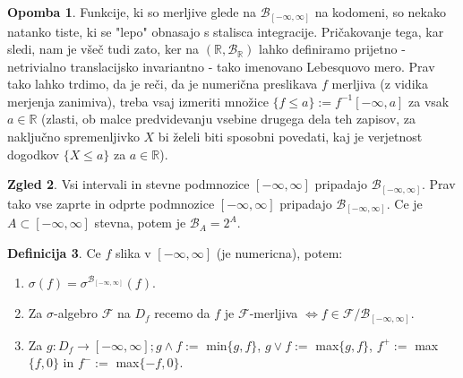 \documentclass[a4paper,12pt]{article}
\theoremstyle{definition} %
\newtheorem{definicija}{Definicija}[section]
\newtheorem{zgled}[definicija]{Zgled}
\newtheorem{opomba}[definicija]{Opomba}
\theoremstyle{plain} %
\newcommand{\R}{\mathbb{R}}
\newcommand{\F}{\mathcal{F}}
\begin{document}
            \begin{opomba}
                Funkcije, ki so merljive glede na $\mathcal{B}_{[-\infty, \infty]}$ na kodomeni, so nekako natanko tiste, ki se "lepo" 
                obnasajo s stalisca integracije. Pričakovanje tega, kar sledi, nam je všeč tudi zato, ker na $(\R, \mathcal{B}_\R)$ 
                lahko definiramo prijetno - netrivialno translacijsko invariantno - tako imenovano Lebesquovo mero. Prav tako lahko 
                trdimo, da je reči, da je numerična preslikava $f$ merljiva (z vidika merjenja zanimiva),
                 treba vsaj izmeriti množice $\{f \leq a\}:= f^{-1}{[-\infty, a]}$ za vsak $a \in \R$ (zlasti, 
                ob malce predvidevanju vsebine drugega dela teh zapisov, za naključno spremenljivko $X$ bi 
                želeli biti sposobni povedati, kaj je verjetnost dogodkov $\{X \leq a\}$ za $a \in \R$).
            \end{opomba}

            \begin{zgled}
                Vsi intervali in stevne podmnozice $[-\infty, \infty]$ pripadajo $\mathcal{B}_{[-\infty, \infty]}$. Prav tako vse zaprte in odprte podmnozice $[-\infty, \infty]$ pripadajo $\mathcal{B}_{[-\infty, \infty]}$. Ce je $A \subset [-\infty, \infty]$ stevna, potem je $\mathcal{B}_A = 2^A.$
            \end{zgled}
        
            \begin{definicija}
                Ce $f$ slika v $[-\infty, \infty]$ (je numericna), potem: 
                \begin{enumerate}
                    \item $\sigma(f) = \sigma^{\mathcal{B}_{[-\infty, \infty]}}(f)$.
                    \item Za $\sigma$-algebro $\F$ na $D_f$ recemo da $f$ je  $\F$-merljiva $\iff f \in \F/\mathcal{B}_{[-\infty, \infty]}$.
                    \item Za $g:D_f \rightarrow [-\infty, \infty]; g \land f :=$ min$\{g, f\}$,  $g \lor f:=$ max$\{g, f\}$, $f^+:=$ max$\{f, 0\}$ in  $f^-:=$ max$\{-f, 0\}$.
                \end{enumerate}
            \end{definicija}
\end{document}
